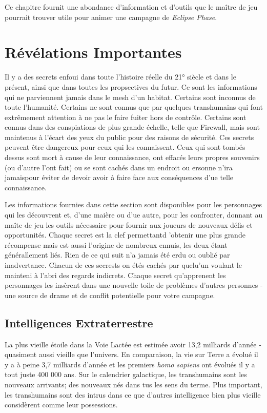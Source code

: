 Ce chapitre fournit une abondance d'information et d'outils que le maître de jeu pourrait trouver utile pour animer une campagne de \textit{Eclipse Phase}. 

\section{Révélations Importantes} 

Il y a des secrets enfoui dans toute l'histoire réelle du 21° siècle et dans le présent, ainsi que dans toutes les propsectives du futur. Ce sont les informations qui ne parviennent jamais dans le mesh d'un habitat. Certains sont inconnus de toute l'humanité. Certains ne sont connus que par quelques transhumains qui font extrêmement attention à ne pas le faire fuiter hors de contrôle. Certains sont connus dans des conspiations de plus grande échelle, telle que Firewall, mais sont maintenus à l'écart des yeux du public pour des raisons de sécurité. Ces secrets peuvent être dangereux pour ceux qui les connaissent. Ceux qui sont tombés dessus sont mort à cause de leur connaissance, ont effacés leurs propres souvenirs (ou d'autre l'ont fait) ou se sont cachés dans un endroit ou ersonne n'ira jamaispour éviter de devoir avoir à faire face aux conséquences d'ue telle connaissance. 

Les informations fournies dans cette section sont disponibles pour les personnages qui les découvrent et, d'une maière ou d'ue autre, pour les confronter, donnant au maîte de jeu les outils nécessaire pour fournir aux joueurs de nouveaux défis et opportunités. Chaque secret est la clef permettantd 'obtenir une plus grande récompense mais est aussi l'origine de nombreux ennuis, les deux étant générallement liés. Rien de ce qui suit n'a jamais été erdu ou oublié par inadvertance. Chacun de ces secrests on étés cachés par quelu'un voulant le mainteni à l'abri des regards indicrets. Chaque secret qu'apprenent les personnages les insèrent dans une nouvelle toile de problèmes d'autres personnes - une source de drame et de conflit potentielle pour votre campagne. 

\subsection{Intelligences Extraterrestre} 

La plus vieille étoile dans la Voie Lactée est estimée avoir 13,2 milliards d'année - quasiment aussi vieille que l'univers. En comparaison, la vie sur Terre a évolué il y a à peine 3,7 milliards d'année et les premiers \textit{homo sapiens} ont évolués il y a tout juste 400 000 ans. Sur le calendrier galactique, les transhumains sont les nouveaux arrivants; des nouveaux nés dans tus les sens du terme. Plus important, les transhumains sont des intrus dans ce que d'autres intelligence bien plus vieille considèrent comme leur possessions. 

